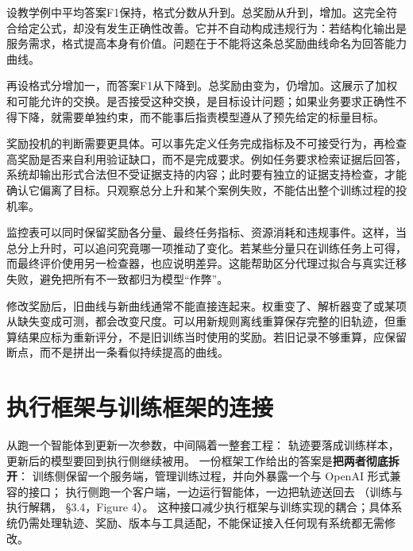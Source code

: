 设教学例中平均答案F1保持，格式分数从升到。总奖励从升到，增加。这完全符合给定公式，却没有发生正确性改善。它并不自动构成违规行为：若结构化输出是服务需求，格式提高本身有价值。问题在于不能将这条总奖励曲线命名为回答能力曲线。

再设格式分增加一，而答案F1从下降到。总奖励由变为，仍增加。这展示了加权和可能允许的交换。是否接受这种交换，是目标设计问题；如果业务要求正确性不得下降，就需要单独约束，而不能事后指责模型遵从了预先给定的标量目标。

奖励投机的判断需要更具体。可以事先定义任务完成指标及不可接受行为，再检查高奖励是否来自利用验证缺口，而不是完成要求。例如任务要求检索证据后回答，系统却输出形式合法但不受证据支持的内容；此时要有独立的证据支持检查，才能确认它偏离了目标。只观察总分上升和某个案例失败，不能估出整个训练过程的投机率。

监控表可以同时保留奖励各分量、最终任务指标、资源消耗和违规事件。这样，当总分上升时，可以追问究竟哪一项推动了变化。若某些分量只在训练任务上可得，而最终评价使用另一检查器，也应说明差异。这能帮助区分代理过拟合与真实迁移失败，避免把所有不一致都归为模型“作弊”。

修改奖励后，旧曲线与新曲线通常不能直接连起来。权重变了、解析器变了或某项从缺失变成可测，都会改变尺度。可以用新规则离线重算保存完整的旧轨迹，但重算结果应标为重新评分，不是旧训练当时使用的奖励。若旧记录不够重算，应保留断点，而不是拼出一条看似持续提高的曲线。

\section{执行框架与训练框架的连接}
\label{sec:ch11-plumbing}

\begin{sloppypar}
从跑一个智能体到更新一次参数，中间隔着一整套工程：
轨迹要落成训练样本，更新后的模型要回到执行侧继续被用。
一份框架工作给出的答案是\textbf{把两者彻底拆开}：
训练侧保留一个服务端，管理训练过程，并向外暴露一个与 OpenAI 形式兼容的接口；
执行侧跑一个客户端，一边运行智能体，一边把轨迹送回去
（训练与执行解耦，\cite{agent-lightning-2508} §3.4，Figure 4）。
这种接口减少执行框架与训练实现的耦合；具体系统仍需处理轨迹、奖励、版本与工具适配，不能保证接入任何现有系统都无需修改。
\end{sloppypar}

